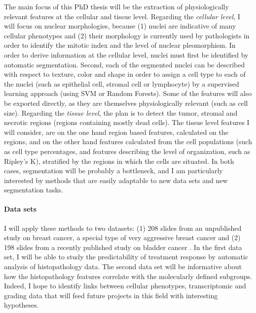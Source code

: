 \documentclass[a4paper,10pt]{article}
\begin{document}
The main focus of this PhD thesis will be the extraction of
physiologically relevant features at the cellular and tissue
level. Regarding the {\em cellular level}, I will focus on nuclear morphologies,
because (1) nuclei are indicative of many cellular
phenotypes\citep{Chow2012} and (2) their morphology is currently used by
pathologists in order to identify the mitotic index and the level of
nuclear pleomorphism\citep{Elston1991}. In order to derive information
at the cellular level, nuclei must first be identified by automatic
segmentation. Second, each of the segmented nuclei can be described
with respect to texture, color and shape in order to assign a cell
type to each of the nuclei (such as epithelial cell, stromal cell or
lymphocyte) by a supervised learning approach (using SVM or Random
Forests). Some of the features will also be exported directly, as they
are themselves physiologically relevant (such as cell size). 
Regarding the {\em tissue level}, the plan is to detect the tumor,
stromal and necrotic regions (regions containing mostly dead
cells). The tissue level features I will consider, are on the one hand
region based features, calculated on the regions, and on the other
hand features calculated from the cell populations (such as cell type
percentages, and features describing the level of organization, such
as Ripley's K), stratified by the regions in which the cells are situated. 
In both cases, segmentation will be probably a bottleneck, and I am
particularly interested by methods that are easily adaptable to new
data sets and new segmentation tasks.

\paragraph{Data sets}

I will apply these methods to
two datasets: (1) 208 slides from an unpublished study on breast
cancer, a special type of very aggressive breast cancer  and (2) 198
slides from a recently published study on bladder cancer
\citep{biton2014independent}. In the first data set, I will be able to
study the predictability of treatment response by automatic
analysis of histopathology data. The second data set will be
informative about how the histopathology features correlate with the
molecularly defined subgroups. Indeed, I hope to identify links between
cellular phenotypes, transcriptomic and grading data that will feed
future projects in this field with interesting hypotheses. 

\end{document}
